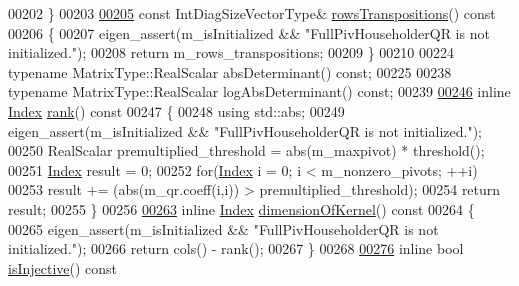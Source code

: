 \begin{DoxyCode}
00202     \}
00203 
\hyperlink{group___q_r___module_abebbfc0ca6e3dd285a0ad0c907abb093}{00205}     \textcolor{keyword}{const} IntDiagSizeVectorType& \hyperlink{group___q_r___module_abebbfc0ca6e3dd285a0ad0c907abb093}{rowsTranspositions}()\textcolor{keyword}{ const}
00206 \textcolor{keyword}{    }\{
00207       eigen\_assert(m\_isInitialized && \textcolor{stringliteral}{"FullPivHouseholderQR is not initialized."});
00208       \textcolor{keywordflow}{return} m\_rows\_transpositions;
00209     \}
00210 
00224     \textcolor{keyword}{typename} MatrixType::RealScalar absDeterminant() \textcolor{keyword}{const};
00225 
00238     \textcolor{keyword}{typename} MatrixType::RealScalar logAbsDeterminant() \textcolor{keyword}{const};
00239 
\hyperlink{group___q_r___module_aeae555220f46477818ccc94aca2de770}{00246}     \textcolor{keyword}{inline} \hyperlink{namespace_eigen_a62e77e0933482dafde8fe197d9a2cfde}{Index} \hyperlink{group___q_r___module_aeae555220f46477818ccc94aca2de770}{rank}()\textcolor{keyword}{ const}
00247 \textcolor{keyword}{    }\{
00248       \textcolor{keyword}{using} std::abs;
00249       eigen\_assert(m\_isInitialized && \textcolor{stringliteral}{"FullPivHouseholderQR is not initialized."});
00250       RealScalar premultiplied\_threshold = abs(m\_maxpivot) * threshold();
00251       \hyperlink{namespace_eigen_a62e77e0933482dafde8fe197d9a2cfde}{Index} result = 0;
00252       \textcolor{keywordflow}{for}(\hyperlink{namespace_eigen_a62e77e0933482dafde8fe197d9a2cfde}{Index} i = 0; i < m\_nonzero\_pivots; ++i)
00253         result += (abs(m\_qr.coeff(i,i)) > premultiplied\_threshold);
00254       \textcolor{keywordflow}{return} result;
00255     \}
00256 
\hyperlink{group___q_r___module_a3b5fe5edc66acc01c45b16e728470aa0}{00263}     \textcolor{keyword}{inline} \hyperlink{namespace_eigen_a62e77e0933482dafde8fe197d9a2cfde}{Index} \hyperlink{group___q_r___module_a3b5fe5edc66acc01c45b16e728470aa0}{dimensionOfKernel}()\textcolor{keyword}{ const}
00264 \textcolor{keyword}{    }\{
00265       eigen\_assert(m\_isInitialized && \textcolor{stringliteral}{"FullPivHouseholderQR is not initialized."});
00266       \textcolor{keywordflow}{return} cols() - rank();
00267     \}
00268 
\hyperlink{group___q_r___module_a6776788011026b0f63192485a59deaed}{00276}     \textcolor{keyword}{inline} \textcolor{keywordtype}{bool} \hyperlink{group___q_r___module_a6776788011026b0f63192485a59deaed}{isInjective}()\textcolor{keyword}{ const}

\end{DoxyCode}
